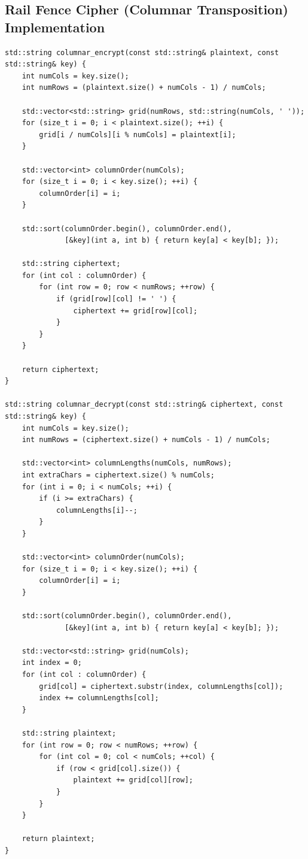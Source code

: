 \documentclass[titlepage]{article}
\begin{document}
\subsection{Rail Fence Cipher (Columnar Transposition) Implementation}
\begin{lstlisting}
std::string columnar_encrypt(const std::string& plaintext, const std::string& key) {
    int numCols = key.size();
    int numRows = (plaintext.size() + numCols - 1) / numCols;

    std::vector<std::string> grid(numRows, std::string(numCols, ' '));
    for (size_t i = 0; i < plaintext.size(); ++i) {
        grid[i / numCols][i % numCols] = plaintext[i];
    }

    std::vector<int> columnOrder(numCols);
    for (size_t i = 0; i < key.size(); ++i) {
        columnOrder[i] = i;
    }

    std::sort(columnOrder.begin(), columnOrder.end(), 
              [&key](int a, int b) { return key[a] < key[b]; });

    std::string ciphertext;
    for (int col : columnOrder) {
        for (int row = 0; row < numRows; ++row) {
            if (grid[row][col] != ' ') {
                ciphertext += grid[row][col];
            }
        }
    }

    return ciphertext;
}

std::string columnar_decrypt(const std::string& ciphertext, const std::string& key) {
    int numCols = key.size();
    int numRows = (ciphertext.size() + numCols - 1) / numCols;

    std::vector<int> columnLengths(numCols, numRows);
    int extraChars = ciphertext.size() % numCols;
    for (int i = 0; i < numCols; ++i) {
        if (i >= extraChars) {
            columnLengths[i]--;
        }
    }

    std::vector<int> columnOrder(numCols);
    for (size_t i = 0; i < key.size(); ++i) {
        columnOrder[i] = i;
    }

    std::sort(columnOrder.begin(), columnOrder.end(), 
              [&key](int a, int b) { return key[a] < key[b]; });

    std::vector<std::string> grid(numCols);
    int index = 0;
    for (int col : columnOrder) {
        grid[col] = ciphertext.substr(index, columnLengths[col]);
        index += columnLengths[col];
    }

    std::string plaintext;
    for (int row = 0; row < numRows; ++row) {
        for (int col = 0; col < numCols; ++col) {
            if (row < grid[col].size()) {
                plaintext += grid[col][row];
            }
        }
    }

    return plaintext;
}
\end{lstlisting}
\end{document}
